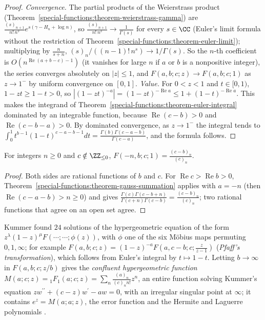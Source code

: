\begin{proof}
\emph{Convergence.} The partial products of the Weierstrass product (Theorem~\ref{special-functions:theorem-weierstrass-gamma}) are $\frac{(s)_{n+1}}{n!\,n^s}e^{s(\gamma - H_n + \log n)}$, so
$\frac{(s)_{n+1}}{n!\,n^s} \to \frac{1}{\Gamma(s)}$ for every $s \in \CC$ (Euler's limit formula without the restriction of Theorem~\ref{special-functions:theorem-euler-limit}); multiplying by $\frac{n}{s + n}$,
$(s)_n/((n - 1)!\,n^s) \to 1/\Gamma(s)$. So the $n$-th coefficient is $O(n^{\operatorname{Re}(a + b - c) - 1})$ (it vanishes for large $n$ if $a$ or $b$ is a nonpositive integer), the series converges absolutely on $|z| \leq 1$, and $F(a, b; c; z) \to F(a, b; c; 1)$
as $z \to 1^-$ by uniform convergence on $[0, 1]$.
\emph{Value.} For $0 < z < 1$ and $t \in [0, 1)$, $1 - zt \geq 1 - t > 0$, so $|(1 - zt)^{-a}| = (1 - zt)^{-\operatorname{Re}a} \leq 1 + (1 - t)^{-\operatorname{Re}a}$. This makes the integrand of Theorem~\ref{special-functions:theorem-euler-integral}
dominated by an integrable function, because $\operatorname{Re}(c - b) > 0$ and $\operatorname{Re}(c - b - a) > 0$. By dominated convergence, as $z \to 1^-$ the integral tends to
$\int_0^1t^{b-1}(1 - t)^{c-a-b-1}dt = \frac{\Gamma(b)\Gamma(c - a - b)}{\Gamma(c - a)}$, and the formula follows.
\end{proof}

\begin{corollary}\label{special-functions:corollary-chu-vandermonde}
For integers $n \geq 0$ and $c \notin \ZZ_{\leq 0}$, $F(-n, b; c; 1) = \frac{(c - b)_n}{(c)_n}$.
\end{corollary}

\begin{proof}
Both sides are rational functions of $b$ and $c$. For $\operatorname{Re}c > \operatorname{Re}b > 0$, Theorem~\ref{special-functions:theorem-gauss-summation} applies with $a = -n$ (then $\operatorname{Re}(c - a - b) > n \geq 0$) and gives
$\frac{\Gamma(c)\Gamma(c - b + n)}{\Gamma(c + n)\Gamma(c - b)} = \frac{(c - b)_n}{(c)_n}$; two rational functions that agree on an open set agree.
\end{proof}

\begin{remark}\label{special-functions:remark-kummer-confluent}
Kummer found $24$ solutions of the hypergeometric equation of the form $z^\lambda(1 - z)^\mu F(\cdots; \cdots; \phi(z))$, with $\phi$ one of the six M\"obius maps permuting $0, 1, \infty$; for example
$F(a, b; c; z) = (1 - z)^{-a}F(a, c - b; c; \frac{z}{z - 1})$ (\emph{Pfaff's transformation}), which follows from Euler's integral by $t \mapsto 1 - t$. Letting $b \to \infty$ in $F(a, b; c; z/b)$ gives the \emph{confluent
hypergeometric function} $M(a; c; z) = {}_1F_1(a; c; z) = \sum_n\frac{(a)_n}{(c)_nn!}z^n$, an entire function solving Kummer's equation $zw^{\prime\prime} + (c - z)w^{\prime} - aw = 0$, with an irregular singular point at $\infty$;
it contains $e^z = M(a; a; z)$, the error function and the Hermite and Laguerre polynomials \cite{andrews-askey-roy}.
\end{remark}

